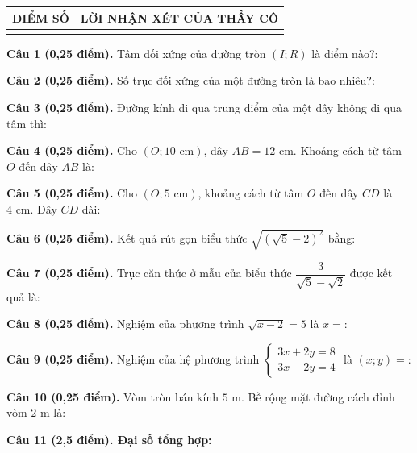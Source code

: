 \documentclass[12pt,a4paper]{article}
\begin{document}
\vspace{1.0mm}

\noindent
\begin{tabularx}{\linewidth}{|p{3.2cm}|X|}
\hline
\centering\textbf{ĐIỂM SỐ} & \centering\textbf{LỜI NHẬN XÉT CỦA THẦY CÔ} \tabularnewline
\hline
\rule{0pt}{1.8cm} & \tabularnewline
\hline
\end{tabularx}

\vspace{1.2mm}
\noindent\textbf{Câu 1 (0,25 điểm).} Tâm đối xứng của đường tròn $(I; R)$ là điểm nào?: \par\vspace{0.6mm}
\noindent\textbf{Câu 2 (0,25 điểm).} Số trục đối xứng của một đường tròn là bao nhiêu?: \par\vspace{0.6mm}
\noindent\textbf{Câu 3 (0,25 điểm).} Đường kính đi qua trung điểm của một dây không đi qua tâm thì: \par\vspace{0.6mm}
\noindent\textbf{Câu 4 (0,25 điểm).} Cho $(O; 10\text{ cm})$, dây $AB = 12\text{ cm}$. Khoảng cách từ tâm $O$ đến dây $AB$ là: \par\vspace{0.6mm}
\noindent\textbf{Câu 5 (0,25 điểm).} Cho $(O; 5\text{ cm})$, khoảng cách từ tâm $O$ đến dây $CD$ là $4\text{ cm}$. Dây $CD$ dài: \par\vspace{0.6mm}
\noindent\textbf{Câu 6 (0,25 điểm).} Kết quả rút gọn biểu thức $\sqrt{(\sqrt{5} - 2)^2}$ bằng: \par\vspace{0.6mm}
\noindent\textbf{Câu 7 (0,25 điểm).} Trục căn thức ở mẫu của biểu thức $\dfrac{3}{\sqrt{5}-\sqrt{2}}$ được kết quả là: \par\vspace{0.6mm}
\noindent\textbf{Câu 8 (0,25 điểm).} Nghiệm của phương trình $\sqrt{x - 2} = 5$ là $x = $: \par\vspace{0.6mm}
\noindent\textbf{Câu 9 (0,25 điểm).} Nghiệm của hệ phương trình $\begin{cases} 3x + 2y = 8 \\ 3x - 2y = 4 \end{cases}$ là $(x; y) = $: \par\vspace{0.6mm}
\noindent\textbf{Câu 10 (0,25 điểm).} Vòm tròn bán kính $5\text{ m}$. Bề rộng mặt đường cách đỉnh vòm $2\text{ m}$ là: \par\vspace{0.6mm}
\vspace{0.8mm}
\noindent\textbf{Câu 11 (2,5 điểm). Đại số tổng hợp:}
\vspace{0.6mm}
\end{document}
